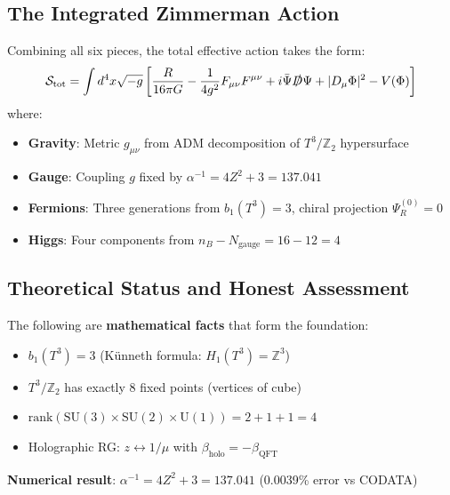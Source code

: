 \documentclass[12pt,a4paper]{article}
\newcommand{\Ztwo}{\mathbb{Z}_2}
\newcommand{\Tthree}{T^3}
\newcommand{\Zsq}{Z^2}
\begin{document}
\subsection{The Integrated Zimmerman Action}

Combining all six pieces, the total effective action takes the form:
\begin{equation}
\mathcal{S}_{\text{tot}} = \int d^4x \sqrt{-g} \left[ \frac{R}{16\pi G} - \frac{1}{4g^2}F_{\mu\nu}F^{\mu\nu} + i\bar{\Psi}\slashed{D}\Psi + |D_\mu\Phi|^2 - V(\Phi) \right]
\end{equation}
where:
\begin{itemize}[itemsep=0pt]
    \item \textbf{Gravity}: Metric $g_{\mu\nu}$ from ADM decomposition of $\Tthree/\Ztwo$ hypersurface
    \item \textbf{Gauge}: Coupling $g$ fixed by $\alpha^{-1} = 4\Zsq + 3 = 137.041$
    \item \textbf{Fermions}: Three generations from $b_1(T^3) = 3$, chiral projection $\Psi_R^{(0)} = 0$
    \item \textbf{Higgs}: Four components from $n_B - N_{\text{gauge}} = 16 - 12 = 4$
\end{itemize}

\subsection{Theoretical Status and Honest Assessment}

\begin{tcolorbox}[colback=green!10!white, colframe=green!60!black, title=What Is Established]
The following are \textbf{mathematical facts} that form the foundation:
\begin{itemize}[itemsep=0pt]
    \item[\checkmark] $b_1(T^3) = 3$ (K\"unneth formula: $H_1(T^3) = \mathbb{Z}^3$)
    \item[\checkmark] $T^3/\mathbb{Z}_2$ has exactly 8 fixed points (vertices of cube)
    \item[\checkmark] $\text{rank}(\text{SU}(3) \times \text{SU}(2) \times \text{U}(1)) = 2 + 1 + 1 = 4$
    \item[\checkmark] Holographic RG: $z \leftrightarrow 1/\mu$ with $\beta_{\text{holo}} = -\beta_{\text{QFT}}$
\end{itemize}
\textbf{Numerical result}: $\alpha^{-1} = 4\Zsq + 3 = 137.041$ (0.0039\% error vs CODATA)
\end{tcolorbox}
\end{document}

